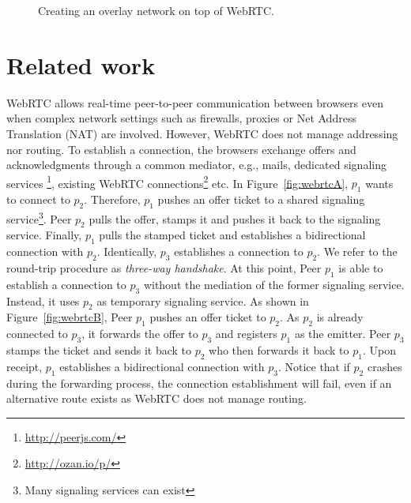 
\begin{figure*}
\centering
{}
\hspace{5pt}
\hspace{5pt}
\caption{\label{fig:webrtc}Creating an overlay network on top of WebRTC.}
\end{figure*}


\section{Related work}
\label{sec:relatedwork}


WebRTC allows real-time peer-to-peer communication between browsers even when
complex network settings such as firewalls, proxies or Net Address Translation
(NAT) are involved. However, WebRTC does not manage addressing nor routing. To
establish a connection, the browsers exchange offers and acknowledgments
through a common mediator, e.g., mails, dedicated signaling services
\footnote{\url{http://peerjs.com/}}, existing WebRTC
connections\footnote{\url{http://ozan.io/p/}} etc. In
Figure~\ref{fig:webrtcA}, $p_1$ wants to connect to $p_2$. Therefore, $p_1$
pushes an offer ticket to a shared signaling service\footnote{Many signaling
  services can exist}. Peer $p_2$ pulls the offer, stamps it and pushes it back
to the signaling service. Finally, $p_1$ pulls the stamped ticket and
establishes a bidirectional connection with $p_2$.  Identically, $p_3$
establishes a connection to $p_2$. We refer to the round-trip procedure as
\emph{three-way handshake}. At this point, Peer $p_1$ is able to establish a
connection to $p_3$ without the mediation of the former signaling service.
Instead, it uses $p_2$ as temporary signaling service.  As shown in
Figure~\ref{fig:webrtcB}, Peer $p_1$ pushes an offer ticket to $p_2$. As
$p_2$ is already connected to $p_3$, it forwards the offer to $p_3$ and
registers $p_1$ as the emitter. Peer $p_3$ stamps the ticket and sends it back
to $p_2$ who then forwards it back to $p_1$. Upon receipt, $p_1$ establishes a
bidirectional connection with $p_3$.  Notice that if $p_2$ crashes during the
forwarding process, the connection establishment will fail, even if an
alternative route exists as WebRTC does not manage routing.

